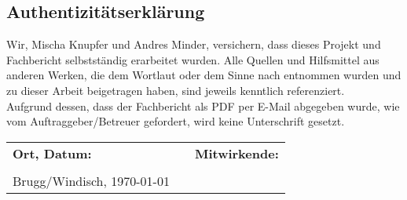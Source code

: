 \subsection{Authentizitätserklärung}

Wir, Mischa Knupfer und Andres Minder, versichern, dass dieses Projekt und Fachbericht selbstständig erarbeitet wurden. Alle Quellen und Hilfsmittel aus anderen Werken, die dem Wortlaut oder dem Sinne nach entnommen wurden und zu dieser Arbeit beigetragen haben, sind jeweils kenntlich referenziert.\\

Aufgrund dessen, dass der Fachbericht als PDF per E-Mail abgegeben wurde, wie vom Auftraggeber/Betreuer gefordert, wird keine Unterschrift gesetzt. \\
\vfill
\begin{center}
\begin{tabular}{p{5cm}p{1cm}l}
\Large\textbf{Ort, Datum:} & & \Large\textbf{Mitwirkende:} \\
\vspace{1cm} & \vspace{1cm} & \vspace{1cm} \\
\Large{Brugg/Windisch, \today} & & \\
\end{tabular}
\end{center}